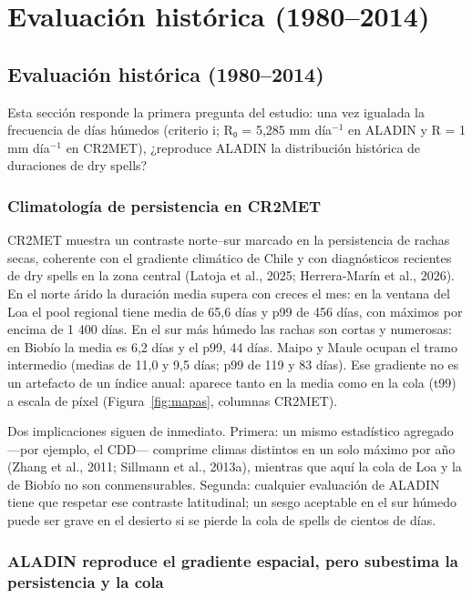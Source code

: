 \chapter{Evaluación histórica (1980–2014)}\label{cap:4}

\section{Evaluación histórica (1980--2014)}\label{sec:eval}

Esta sección responde la primera pregunta del estudio: una vez igualada la frecuencia de días húmedos (criterio i; R₀ = 5,285 mm día$^{-1}$ en ALADIN y R = 1 mm día$^{-1}$ en CR2MET), ¿reproduce ALADIN la distribución histórica de duraciones de dry spells?

\subsection{Climatología de persistencia en CR2MET}\label{sec:climatologia}

CR2MET muestra un contraste norte--sur marcado en la persistencia de rachas secas, coherente con el gradiente climático de Chile y con diagnósticos recientes de dry spells en la zona central (Latoja et al., 2025; Herrera-Marín et al., 2026). En el norte árido la duración media supera con creces el mes: en la ventana del Loa el pool regional tiene media de 65,6 días y p99 de 456 días, con máximos por encima de 1 400 días. En el sur más húmedo las rachas son cortas y numerosas: en Biobío la media es 6,2 días y el p99, 44 días. Maipo y Maule ocupan el tramo intermedio (medias de 11,0 y 9,5 días; p99 de 119 y 83 días). Ese gradiente no es un artefacto de un índice anual: aparece tanto en la media como en la cola (t99) a escala de píxel (Figura~\ref{fig:mapas}, columnas CR2MET).

Dos implicaciones siguen de inmediato. Primera: un mismo estadístico agregado ---por ejemplo, el CDD--- comprime climas distintos en un solo máximo por año (Zhang et al., 2011; Sillmann et al., 2013a), mientras que aquí la cola de Loa y la de Biobío no son conmensurables. Segunda: cualquier evaluación de ALADIN tiene que respetar ese contraste latitudinal; un sesgo aceptable en el sur húmedo puede ser grave en el desierto si se pierde la cola de spells de cientos de días.

\subsection{ALADIN reproduce el gradiente espacial, pero subestima la persistencia y la cola}\label{sec:sesgo}

